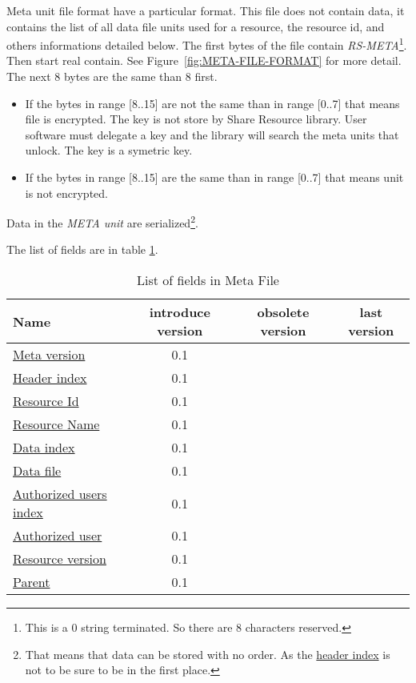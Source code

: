 Meta unit file format have a particular format.
This file does not contain data, it contains the list of all data file units used for a resource, the resource id, and others informations detailed below.
The first bytes of the file contain \emph{RS-META}\footnote{This is a 0 string terminated. So there are 8 characters reserved.}.
Then start real contain.
See Figure~\ref{fig:META-FILE-FORMAT} for more detail.
The next 8 bytes are the same than 8 first.
\begin{itemize}
 \item If the bytes in range [8..15] are not the same than in range [0..7] that means file is encrypted.
The key is not store by Share Resource library.
User software must delegate a key and the library will search the meta units that unlock.
The key is a symetric key.
 \item If the bytes in range [8..15] are the same than in range [0..7] that means unit is not encrypted.
\end{itemize}


Data in the \emph{META unit} are serialized\footnote{That means that data can be stored with no order. As the \hyperlink{fields:header-index}{header index} is not to be sure to be in the first place.}.



The list of fields are in table \ref{tab:field-list}.

\begin{table}[htbp]
  \begin{tabular}{l|c|c|c}
    Name & introduce version & obsolete version & last version \\
    \hline
    \hyperlink{fields:meta-version}{Meta version} & 0.1 & & \\
    \hyperlink{fields:header-index}{Header index} & 0.1 & & \\
    \hyperlink{fields:resource-id}{Resource Id} & 0.1 & & \\
    \hyperlink{fields:resource-name}{Resource Name} & 0.1 & & \\
    \hyperlink{fields:data-index}{Data index} & 0.1 & & \\
    \hyperlink{fields:data-file}{Data file} & 0.1 & & \\
    \hyperlink{fields:auth-user-index}{Authorized users index} & 0.1 & & \\
    \hyperlink{fields:auth-user}{Authorized user} & 0.1 & & \\
    \hyperlink{fields:version}{Resource version} & 0.1 & & \\
    \hyperlink{fields:parents}{Parent} & 0.1 & & \\
  \end{tabular}
  \caption{List of fields in Meta File}
  \label{tab:field-list}
\end{table}


